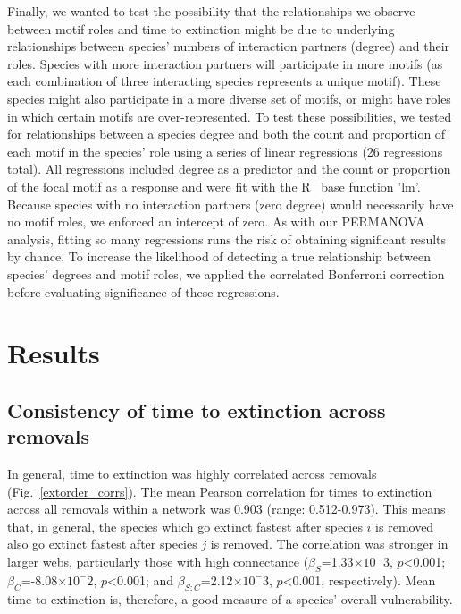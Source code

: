 \documentclass[12pt]{article}
\begin{document}
			Finally, we wanted to test the possibility that the relationships we observe between motif roles and time to extinction might be due to underlying relationships between species' numbers of interaction partners (degree) and their roles.
			Species with more interaction partners will participate in more motifs (as each combination of three interacting species represents a unique motif).
			These species might also participate in a more diverse set of motifs, or might have roles in which certain motifs are over-represented.
			To test these possibilities, we tested for relationships between a species degree and both the count and proportion of each motif in the species' role using a series of linear regressions (26 regressions total).
			All regressions included degree as a predictor and the count or proportion of the focal motif as a response and were fit with the R~\citep{R} base function 'lm'.
			Because species with no interaction partners (zero degree) would necessarily have no motif roles, we enforced an intercept of zero.
			As with our PERMANOVA analysis, fitting so many regressions runs the risk of obtaining significant results by chance.
			To increase the likelihood of detecting a true relationship between species' degrees and motif roles, we applied the correlated Bonferroni correction~\citep{Drezner2016} before evaluating significance of these regressions.


\section{Results}
	
	\subsection*{Consistency of time to extinction across removals}

		In general, time to extinction was highly correlated across removals (Fig.~\ref{extorder_corrs}). %
		The mean Pearson correlation for times to extinction across all removals within a network was 0.903 (range: 0.512-0.973). %
		This means that, in general, the species which go extinct fastest after species $i$ is removed also go extinct fastest after species $j$ is removed.
		The correlation was stronger in larger webs, particularly those with high connectance ($\beta_{S}$=1.33$\times10^-3$, $p$\textless0.001; $\beta_{C}$=-8.08$\times10^-2$, $p$\textless0.001; and $\beta_{S:C}$=2.12$\times10^-3$, $p$\textless0.001, respectively). 
		Mean time to extinction is, therefore, a good measure of a species' overall vulnerability.
\end{document}

